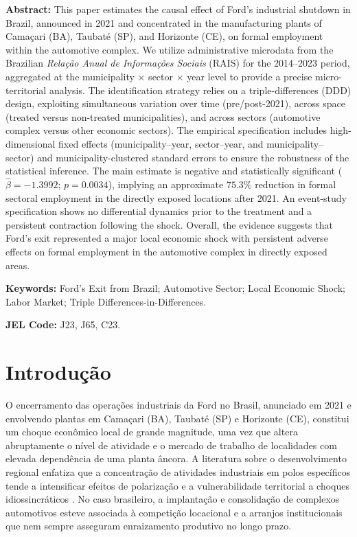 \documentclass[12pt,a4paper]{article}
\begin{document}
\bigskip

\noindent\textbf{Abstract:} This paper estimates the causal effect of Ford's industrial shutdown in Brazil, announced in 2021 and concentrated in the manufacturing plants of Cama\c{c}ari (BA), Taubat\'e (SP), and Horizonte (CE), on formal employment within the automotive complex. We utilize administrative microdata from the Brazilian \textit{Rela\c{c}\~ao Anual de Informa\c{c}\~oes Sociais} (RAIS) for the 2014--2023 period, aggregated at the municipality $\times$ sector $\times$ year level to provide a precise micro-territorial analysis. The identification strategy relies on a triple-differences (DDD) design, exploiting simultaneous variation over time (pre/post-2021), across space (treated versus non-treated municipalities), and across sectors (automotive complex versus other economic sectors). The empirical specification includes high-dimensional fixed effects (municipality--year, sector--year, and municipality--sector) and municipality-clustered standard errors to ensure the robustness of the statistical inference. The main estimate is negative and statistically significant ($\hat{\beta} = -1.3992$; $p = 0.0034$), implying an approximate $75.3\%$ reduction in formal sectoral employment in the directly exposed locations after 2021. An event-study specification shows no differential dynamics prior to the treatment and a persistent contraction following the shock. Overall, the evidence suggests that Ford's exit represented a major local economic shock with persistent adverse effects on formal employment in the automotive complex in directly exposed areas.

\medskip
\noindent\textbf{Keywords:} Ford's Exit from Brazil; Automotive Sector; Local Economic Shock; Labor Market; Triple Differences-in-Differences.

\medskip
\noindent\textbf{JEL Code:} J23, J65, C23.

\clearpage

\section{Introdu\c{c}\~ao}
\label{sec:intro}

O encerramento das opera\c{c}\~oes industriais da Ford no Brasil, anunciado em 2021 e envolvendo plantas em Cama\c{c}ari (BA), Taubat\'e (SP) e Horizonte (CE), constitui um choque econ\^omico local de grande magnitude, uma vez que altera abruptamente o n\'ivel de atividade e o mercado de trabalho de localidades com elevada depend\^encia de uma planta \^ancora. A literatura sobre o desenvolvimento regional enfatiza que a concentra\c{c}\~ao de atividades industriais em polos espec\'ificos tende a intensificar efeitos de polariza\c{c}\~ao e a vulnerabilidade territorial a choques idiossincr\'aticos \parencite{yeung2017}. No caso brasileiro, a implanta\c{c}\~ao e consolida\c{c}\~ao de complexos automotivos esteve associada \`a competi\c{c}\~ao locacional e a arranjos institucionais que nem sempre asseguram enraizamento produtivo no longo prazo.
\end{document}
